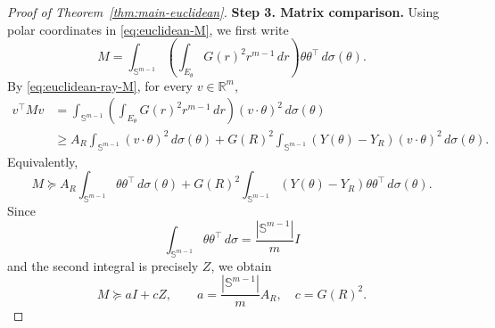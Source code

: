 \documentclass[11pt,letterpaper,reqno]{amsart}
\theoremstyle{definition}
\newcommand{\Sph}{\mathbb S}
\begin{document}
\begin{proof}[Proof of Theorem~\ref{thm:main-euclidean}]
\medskip
\noindent\textbf{Step 3. Matrix comparison.} Using polar coordinates in \eqref{eq:euclidean-M}, we first write
\[
        M
        =
        \int_{\Sph^{m-1}}
        \left(
        \int_{E_\theta}G(r)^2r^{m-1}\,dr
        \right)
        \theta\theta^\top \,d\sigma(\theta).
\]
By \eqref{eq:euclidean-ray-M}, for every \(v\in\mathbb R^m\),
\[
\begin{aligned}
        v^\top  Mv
        &=
        \int_{\Sph^{m-1}}
        \left(
        \int_{E_\theta}G(r)^2r^{m-1}\,dr
        \right)
        (v\cdot\theta)^2\,d\sigma(\theta) \\
        &\geq
        A_R\int_{\Sph^{m-1}}(v\cdot\theta)^2\,d\sigma(\theta)
        +
        G(R)^2
        \int_{\Sph^{m-1}}(Y(\theta)-Y_R)(v\cdot\theta)^2\,d\sigma(\theta).
\end{aligned}
\]
Equivalently,
\[
        M\succeq
        A_R\int_{\Sph^{m-1}}\theta\theta^\top \,d\sigma(\theta)
        +
        G(R)^2
        \int_{\Sph^{m-1}}(Y(\theta)-Y_R)\theta\theta^\top \,d\sigma(\theta) .
\]
Since
\[
        \int_{\Sph^{m-1}}\theta\theta^\top \,d\sigma
        =
        \frac{|\Sph^{m-1}|}{m}I
\]
and the second integral is precisely \(Z\), we obtain
\begin{equation}\label{eq:euclidean-M-lower}
        M\succeq aI+cZ,
        \qquad
        a=\frac{|\Sph^{m-1}|}{m}A_R,
        \quad
        c=G(R)^2 .
\end{equation}


\end{proof}
\end{document}
